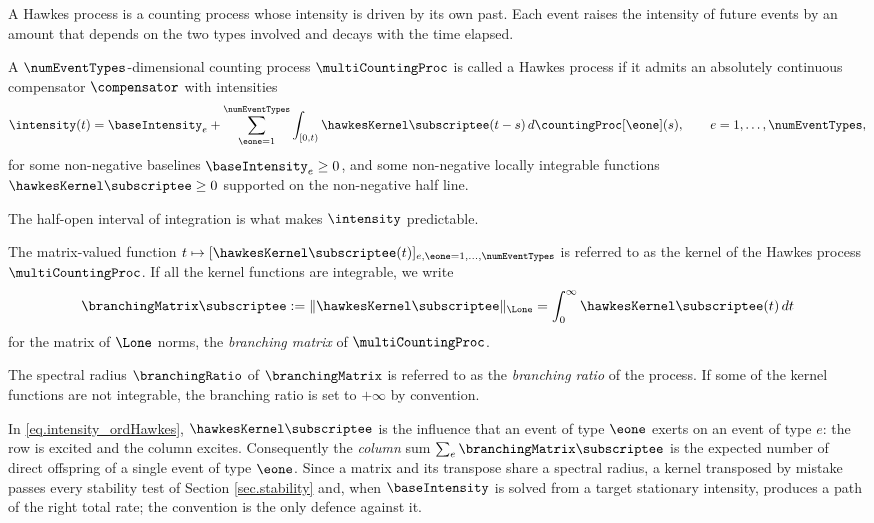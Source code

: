 A Hawkes process is a counting process whose intensity is driven by its own past.
Each event raises the intensity of future events by an amount that depends on the two types
involved and decays with the time elapsed.

\begin{defi}\label{def.hawkesprocess}
 A $\numEventTypes$-dimensional counting process $\multiCountingProc$ is called a Hawkes process
 if it admits an absolutely continuous compensator $\compensator$ with intensities
 \begin{equation}\label{eq.intensity_ordHawkes}
  \intensity(t) = \baseIntensity_e
  + \sum_{\eone=1}^{\numEventTypes}\int_{[0,t)} \hawkesKernel\subscriptee(t-s) \, d\countingProc[\eone](s),
  \qquad e = 1,\dots,\numEventTypes,
 \end{equation}
 for some non-negative baselines $\baseIntensity_e \geq 0$,
 and some non-negative locally integrable functions $\hawkesKernel\subscriptee \geq 0$
 supported on the non-negative half line.
\end{defi}
The half-open interval of integration is what makes $\intensity$ predictable.

The matrix-valued function
$t\mapsto [\hawkesKernel\subscriptee(t)]_{e,\eone = 1, \dots, \numEventTypes}$
is referred to as the kernel of the Hawkes process $\multiCountingProc$.
If all the kernel functions are integrable, we write
\begin{equation}\label{eq.branchingMatrix}
 \branchingMatrix\subscriptee := \Vert \hawkesKernel\subscriptee \Vert_{\Lone}
 = \int_{0}^{\infty} \hawkesKernel\subscriptee(t) \, dt
\end{equation}
for the matrix of $\Lone$ norms,
the \emph{branching matrix} of $\multiCountingProc$.

The spectral radius $\branchingRatio$ of $\branchingMatrix$
is referred to as the \emph{branching ratio} of the process.
If some of the kernel functions are not integrable,
the branching ratio is set to $+\infty$ by convention.

\begin{remark}\label{remark.indexOrder}
 In \eqref{eq.intensity_ordHawkes},
 $\hawkesKernel\subscriptee$ is the influence that an event of type $\eone$
 exerts on an event of type $e$:
 the row is excited and the column excites.
 Consequently the \emph{column} sum $\sum_{e}\branchingMatrix\subscriptee$
 is the expected number of direct offspring of a single event of type $\eone$.
 Since a matrix and its transpose share a spectral radius,
 a kernel transposed by mistake passes every stability test of
 Section \ref{sec.stability}
 and, when $\baseIntensity$ is solved from a target stationary intensity,
 produces a path of the right total rate;
 the convention is the only defence against it.
\end{remark}

